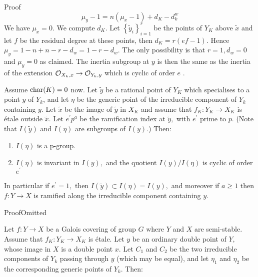 \begin{frame}
    \begin{block}{Proof}
        $$ \mu_{y}-1=n\left(\mu_{x}-1\right)+d_{K}-d_{k}^{w} $$
        We have $\mu_{x}=0$. We compute $d_{K}$. Let $\left\{\tilde{y}_{i}\right\}_{i=1}^{r}$ be the points of $Y_{K}$ above $\tilde{x}$ and let $f$ be the residual degree at these points, then $d_{K}=r(e f-1) .$ Hence $\mu_{y}=1-n+n-r-d_{w}=1-r-d_{w}$. The only possibility is that $r=1, d_{w}=0$ and $\mu_{y}=0$ as claimed. The inertia subgroup at $y$ is then the same as the inertia of the extension $\operatorname{\mathcal{O}}_{X_{k}, x} \rightarrow \operatorname{\mathcal{O}}_{Y_{k}, y}$ which is cyclic of order $e$ \qedhere.
    \end{block}
    \end{frame}\begin{frame}
    \begin{proposition}
        Assume $\operatorname{char}(K) = 0$ now. Let $\tilde{y}$ be a rational point of $Y_{K}$ which specialises to a point $y$ of $Y_{k}$, and let $\eta$ be the generic point of the irreducible component of $Y_{k}$ containing $y .$ Let $\tilde{x}$ be the image of $\tilde{y}$ in $X_{K}$ and assume that $f_{K}: Y_{K} \rightarrow X_{K}$ is étale outside $\tilde{x} .$ Let $e^{\prime} p^{a}$ be the ramification
        index at $\tilde{y},$ with $e^{\prime}$ prime to $p .$ (Note that $I(\tilde{y})$ and $I(\eta)$ are subgroups of $I(y)$.)
        Then:
        \begin{enumerate}
            \item $I(\eta)$ is a p-group.
            \item $I(\eta)$ is invariant in $I(y),$ and the quotient $I(y) / I(\eta)$ is cyclic of order
        $e^{\prime}$
        \end{enumerate}
        In particular if $e^{\prime}=1,$ then $I(\tilde{y}) \subset I(\eta)=I(y),$ and moreover if $a \geq 1$ then
        $f: Y \rightarrow X$ is ramified along the irreducible component containing $y$.
    \end{proposition}
    \begin{block}{Proof}Omitted\end{block}
    \end{frame}\begin{frame}
    \begin{proposition}
        Let $f: Y \rightarrow X$ be a Galois covering of group $G$ where $Y$ and $X$ are semi-stable. Assume that $f_{K}: Y_{K} \rightarrow X_{K}$ is étale. Let $y$ be an ordinary double point of $Y,$ whose image in $X$ is a double point $x$. Let $C_{1}$ and $C_{2}$ be the two irreducible components of $Y_{k}$ passing through $y$ (which may be equal), and let $\eta_{1}$ and $\eta_{2}$ be the corresponding generic points of $Y_{k} .$ Then:


\end{proposition}
\end{frame}
